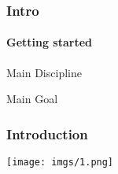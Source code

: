\begin{frame}
    \frametitle{Intro}
    \framesubtitle{Getting started}
    \addtocounter{nframe}{1}
    
    \begin{block}{Main Discipline}
    \end{block}

    \begin{block}{Main Goal}
    \end{block}

\end{frame}

\begin{frame}
    \frametitle{Introduction}
    \addtocounter{nframe}{1}
    
    \begin{center}
        \texttt{[image: imgs/1.png]}
    \end{center}

\end{frame}

 
